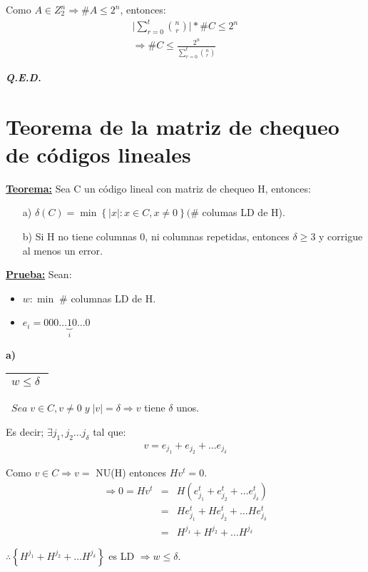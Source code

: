 \documentclass[12pt,a4paper]{report}
\newcounter{neq}
\newcommand{\QED}{\hfill \textit{\textbf{Q.E.D.}}}
\begin{document}
			\par Como $A \in Z_{2}^{n} \Rightarrow \# A \leq 2^{n}$, entonces:
			\begin{eqnarray}
				\nonumber \lvert \sum_{r = 0}^{t} {n \choose r} \rvert * \# C \leq 2^{n} \\
				\nonumber \Rightarrow \# C \leq \frac{2^{n}}{\sum_{r = 0}^{t} {n \choose r}}
			\end{eqnarray}

		\QED

	\section{Teorema de la matriz de chequeo de códigos lineales}
		\textbf{\underline{Teorema:}} Sea C un código lineal con matriz de chequeo H, entonces:
			\begin{itemize}
				\item[a)] $\delta(C) = \min \left\lbrace \lvert x \rvert : x \in C , x \neq 0 \right\rbrace (\#$ columas LD de H).
				\item[b)] Si H no tiene columnas 0, ni columnas repetidas, entonces $\delta \geq 3$ y corrigue al menos un error.
			\end{itemize}

		\textbf{\underline{Prueba:}} Sean:
			\begin{itemize}
				\item $w : \min \; \#$ columnas LD de H.
				\item $e_{i} = 000 \dotsc \underbrace{1}_{i} 0 \dotsc 0$
			\end{itemize}

			\textbf{a)} \begin{tabular}{|c|} \hline $w \leq \delta \; $ \\\hline \end{tabular} $ \; \; Sea \; v \in C , v \neq 0 \; y \; \lvert v \rvert = \delta \Rightarrow v$ tiene $\delta$ unos.

			\vspace{3mm}
			\par Es decir; $\exists j_{1}, j_{2} \dotsc j_{\delta}$ tal que:
			\begin{eqnarray}
				\nonumber v = e_{j_{1}} + e_{j_{2}} + \dotsc e_{j_{\delta}}
			\end{eqnarray}

			\par Como $ v \in C \Rightarrow v =$ NU(H) entonces $Hv^{t} = 0$.
			\begin{eqnarray}
				\nonumber \Rightarrow 0 = Hv^{t} &=& H(e_{j_{1}}^{t} + e_{j_{2}}^{t} + \dotsc e_{j_{\delta}}^{t}) \\
				\nonumber &=& H e_{j_{1}}^{t} + H e_{j_{2}}^{t} + \dotsc H e_{j_{\delta}}^{t} \\
				\nonumber &=& H^{j_{1}} + H^{j_{2}} + \dotsc H^{j_{\delta}}
			\end{eqnarray}
			\par $\therefore \left\lbrace H^{j_{1}} + H^{j_{2}} + \dotsc H^{j_{\delta}} \right\rbrace$ es LD $\Rightarrow w \leq \delta$.
\end{document}
